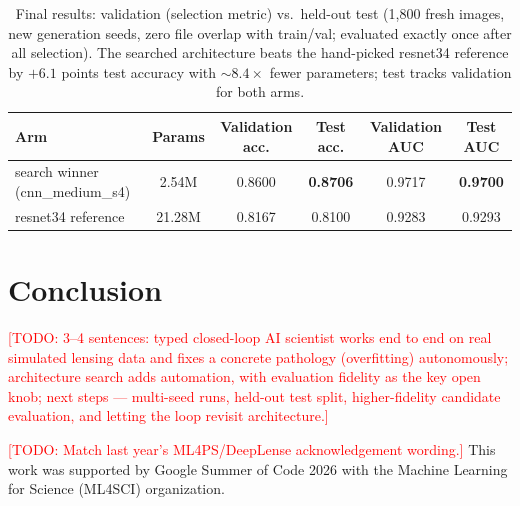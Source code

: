 \documentclass{article}
\newcommand{\todo}[1]{\textcolor{red}{[TODO: #1]}}
\begin{document}
\begin{table}[t]
  \caption{Final results: validation (selection metric) vs.\ held-out test
  (1{,}800 fresh images, new generation seeds, zero file overlap with train/val;
  evaluated exactly once after all selection). The searched architecture beats the
  hand-picked resnet34 reference by $+6.1$ points test accuracy with
  ${\sim}8.4\times$ fewer parameters; test tracks validation for both arms.}
  \label{tab:final}
  \centering
  \small
  \begin{tabular}{lccccc}
    \toprule
    Arm & Params & Validation acc. & \textbf{Test acc.} & Validation AUC & \textbf{Test AUC} \\
    \midrule
    search winner (cnn\_medium\_s4) & 2.54M & 0.8600 & \textbf{0.8706} & 0.9717 & \textbf{0.9700} \\
    resnet34 reference & 21.28M & 0.8167 & 0.8100 & 0.9283 & 0.9293 \\
    \bottomrule
  \end{tabular}
\end{table}

\section{Conclusion}
\todo{3--4 sentences: typed closed-loop AI scientist works end to end on real
simulated lensing data and fixes a concrete pathology (overfitting) autonomously;
architecture search adds automation, with evaluation fidelity as the key open knob;
next steps — multi-seed runs, held-out test split, higher-fidelity candidate
evaluation, and letting the loop revisit architecture.}

\begin{ack}
\todo{Match last year's ML4PS/DeepLense acknowledgement wording.} This work was
supported by Google Summer of Code 2026 with the Machine Learning for Science
(ML4SCI) organization.
\end{ack}



\end{document}

